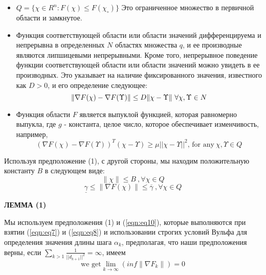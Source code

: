 \begin{itemize}
    \item $Q=\{\chi\in R^{n}\colon F(\chi)\leq F(\chi_{\circ})\}$ Это
    ограниченное множество в первичной области и замкнутое.
    \item Функция соответствующей области или области значений дифференцируема и
    непрерывна в определенных $N$ областях множества $q$, и ее производные
    являются липшицевыми непрерывными. Кроме того, непрерывное поведение функции
    соответствующей области или области значений можно увидеть в ее производных.
    Это указывает на наличие фиксированного значения, известного как $D > 0$, и
    его определение следующее:
    \begin{equation*}
        \|\nabla F(\chi)-{\cal \nabla}F(\Upsilon)\|\leq D\|\chi-\Upsilon\|\ \forall\chi,\Upsilon\in N
    \end{equation*}
    \item Функция области $F$ является выпуклой функцией, которая равномерно
    выпукла, где $g$ - константа, целое число, которое обеспечивает изменчивость,
    например,
    \begin{equation*}
        \left(\nabla F(\chi)-\nabla F(\Upsilon)\right)^{T}(\chi-\Upsilon)\geq\mu||\chi-\Upsilon||^{2} \text{, for any} \ \chi,\Upsilon\in Q
    \end{equation*}
\end{itemize}

\noindent Используя предположение (1), с другой стороны, мы находим
положительную константу $B$ в следующем виде:
\begin{equation*}
    \|\chi\|\leq B\ ,\forall\chi\in Q
\end{equation*}
\begin{equation}\label{eqn:eq10}
    \underline{{{\gamma}}}\leq\|\nabla F(\chi)\|\leq\overline{{{\gamma}}}\ ,\forall\chi\in Q
\end{equation}

\noindent \textbf{ЛЕММА (1)}

Мы используем предположения (1) и (\ref{eqn:eq10}), которые выполняются при
взятии (\ref{eqn:eq7}) и (\ref{eqn:eq8}) и использовании строгих условий Вульфа
для определения значения длины шага $\alpha_{k}$, предполагая, что наши
предположения верны, если
$\textstyle\sum_{k>1}{\frac{1}{||d_{k+1}||^{2}}}=\infty$, имеем
\begin{equation*}
    \text{we get} \lim_{k \rightarrow \infty}\left(i n f\lVert\nabla F_{k}\rVert\right)=0
\end{equation*}

